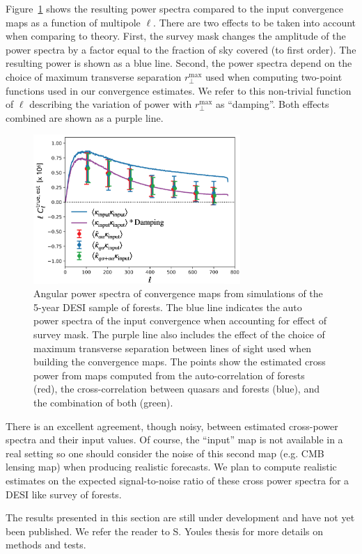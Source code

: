 Figure~\ref{fig:forest_lensing_power_spectra} shows the resulting power spectra
compared to the input convergence maps as a function of multipole $\ell$. 
There are two effects to be taken into account when comparing to theory. 
First, the survey mask changes the amplitude of the power spectra by a factor equal 
to the fraction of sky covered (to first order). The resulting power is shown as a blue line. 
Second, the power spectra depend on the choice of maximum transverse separation $r_\perp^\mathrm{max}$ 
used when computing two-point functions used in our convergence estimates. 
We refer to this non-trivial function of $\ell$ describing 
the variation of power with $r_\perp^\mathrm{max}$
as ``damping''. Both effects combined are shown as a purple line.


\begin{figure}[!th]
    \centering
    \includegraphics[width=0.7\textwidth]{fig/forests/forest_lensing_power_spectra.png}
    \caption{Angular power spectra of convergence maps from simulations of the 5-year DESI sample of \lya forests. 
    The blue line indicates the auto power spectra of the input convergence when 
    accounting for effect of survey mask. The purple line also includes the effect of 
    the choice of maximum transverse separation between lines of sight used when 
    building the convergence maps. The points show the estimated cross power 
    from maps computed from the auto-correlation of forests (red), the cross-correlation 
    between quasars and forests (blue), and the combination of both (green). 
    }
    \label{fig:forest_lensing_power_spectra}
\end{figure}

There is an excellent agreement, though noisy, between estimated cross-power spectra  
and their input values. Of course, the ``input'' map is not available in a real setting 
so one should consider the noise of this second map (e.g. CMB lensing map) when producing
realistic forecasts. We plan to compute realistic estimates on the expected signal-to-noise ratio 
of these cross power spectra for a DESI like survey of forests. 

The results presented in this section are still under development and have not yet  
been published. We refer the reader to S. Youles thesis for more details on methods 
and tests. 



